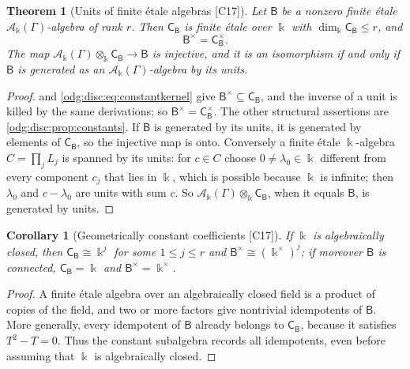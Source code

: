 \documentclass[11pt,oneside]{article}
\numberwithin{equation}{section}
\newtheorem{theorem}{Theorem}[section]
\newtheorem{corollary}[corollary]{Corollary}
\theoremstyle{definition}
\theoremstyle{remark}
\newcommand{\src}[1]{\textup{\textsf{\small[#1]}}}
\newcommand{\crA}{\mathcal A_\Bbbk(\Gamma)}
\begin{document}
\begin{theorem}[Units of finite \'etale algebras \src{C17}]\label{odg:disc:thm:units}
Let $\mathsf B$ be a nonzero finite \'etale $\crA$-algebra of rank $r$. Then
$\mathsf C_{\mathsf B}$ is finite \'etale over $\Bbbk$ with
$\dim_\Bbbk\mathsf C_{\mathsf B}\le r$, and
\begin{equation}\label{odg:disc:eq:units}
 \mathsf B^\times=\mathsf C_{\mathsf B}^\times .
\end{equation}
The map $\crA\otimes_\Bbbk\mathsf C_{\mathsf B}\to\mathsf B$ is injective, and it is an
isomorphism if and only if $\mathsf B$ is generated as an $\crA$-algebra by its units.
\end{theorem}
\begin{proof}
 and \eqref{odg:disc:eq:constantkernel} give
$\mathsf B^\times\subseteq\mathsf C_{\mathsf B}$, and the inverse of a unit is killed by the
same derivations; so $\mathsf B^\times=\mathsf C_{\mathsf B}^\times$. The other structural
assertions are \cref{odg:disc:prop:constants}. If $\mathsf B$ is generated by its units, it
is generated by elements of $\mathsf C_{\mathsf B}$, so the injective map is onto.
Conversely a finite \'etale $\Bbbk$-algebra $C=\prod_jL_j$ is spanned by its units: for
$c\in C$ choose $0\ne\lambda_0\in\Bbbk$ different from every component $c_j$ that lies in
$\Bbbk$, which is possible because $\Bbbk$ is infinite; then $\lambda_0$ and $c-\lambda_0$
are units with sum $c$. So $\crA\otimes_\Bbbk\mathsf C_{\mathsf B}$, when it equals
$\mathsf B$, is generated by units.
\end{proof}

\begin{corollary}[Geometrically constant coefficients \src{C17}]\label{odg:disc:cor:algclosed}
If $\Bbbk$ is algebraically closed, then $\mathsf C_{\mathsf B}\cong\Bbbk^j$ for some
$1\le j\le r$ and $\mathsf B^\times\cong(\Bbbk^\times)^j$; if moreover $\mathsf B$ is
connected, $\mathsf C_{\mathsf B}=\Bbbk$ and $\mathsf B^\times=\Bbbk^\times$.
\end{corollary}
\begin{proof}
A finite \'etale algebra over an algebraically closed field is a product of copies of the
field, and two or more factors give nontrivial idempotents of $\mathsf B$. More generally,
every idempotent of $\mathsf B$ already belongs to $\mathsf C_{\mathsf B}$, because it
satisfies $T^2-T=0$. Thus the constant subalgebra records all idempotents, even before
assuming that $\Bbbk$ is algebraically closed.
\end{proof}
\end{document}
